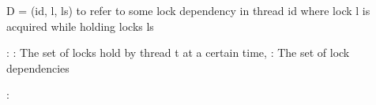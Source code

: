 \documentclass[landscape, a4paper]{article}
\begin{document}
\newpage

\begin{minipage}[t]{0.19\linewidth}
	\raggedright
	\begin{betterlist}
		\item D = (id, l, ls) to refer to some lock dependency in thread id where lock l is acquired while holding locks ls
		\item {}: : The set of locks hold by thread t at a certain time, : The set of lock dependencies
		\item {}:


\end{betterlist}
\end{minipage}
\end{document}
